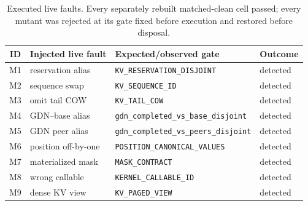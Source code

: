 \begin{table}[H]
\caption{Executed live faults. Every separately rebuilt matched-clean cell passed; every mutant was rejected at its gate fixed before execution and restored before disposal.}
\label{tab:rr2-mutants}
\centering\footnotesize
\begin{tabular}{@{}clll@{}}
\toprule
ID & Injected live fault & Expected/observed gate & Outcome \\
\midrule
M1 & reservation alias & \texttt{KV\_RESERVATION\_DISJOINT} & detected \\ 
M2 & sequence swap & \texttt{KV\_SEQUENCE\_ID} & detected \\ 
M3 & omit tail COW & \texttt{KV\_TAIL\_COW} & detected \\ 
M4 & GDN--base alias & \texttt{gdn\_completed\_vs\_base\_disjoint} & detected \\ 
M5 & GDN peer alias & \texttt{gdn\_completed\_vs\_peers\_disjoint} & detected \\ 
M6 & position off-by-one & \texttt{POSITION\_CANONICAL\_VALUES} & detected \\ 
M7 & materialized mask & \texttt{MASK\_CONTRACT} & detected \\ 
M8 & wrong callable & \texttt{KERNEL\_CALLABLE\_ID} & detected \\ 
M9 & dense KV view & \texttt{KV\_PAGED\_VIEW} & detected \\ 
\bottomrule
\end{tabular}
\end{table}
